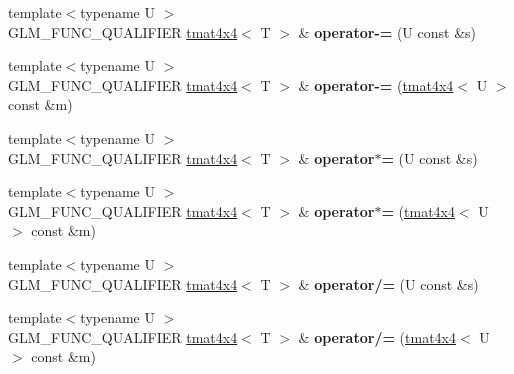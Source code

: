 \begin{DoxyCompactItemize}
\item 
\hypertarget{structglm_1_1detail_1_1tmat4x4_a4ee5d7f6aa93a3c6c816514b804e6de7}{}{\footnotesize template$<$typename U $>$ }\\G\+L\+M\+\_\+\+F\+U\+N\+C\+\_\+\+Q\+U\+A\+L\+I\+F\+I\+E\+R \hyperlink{structglm_1_1detail_1_1tmat4x4}{tmat4x4}$<$ T $>$ \& {\bfseries operator-\/=} (U const \&s)\label{structglm_1_1detail_1_1tmat4x4_a4ee5d7f6aa93a3c6c816514b804e6de7}

\item 
\hypertarget{structglm_1_1detail_1_1tmat4x4_a8f63e9aac83bd9ec75b6f3b53d02c201}{}{\footnotesize template$<$typename U $>$ }\\G\+L\+M\+\_\+\+F\+U\+N\+C\+\_\+\+Q\+U\+A\+L\+I\+F\+I\+E\+R \hyperlink{structglm_1_1detail_1_1tmat4x4}{tmat4x4}$<$ T $>$ \& {\bfseries operator-\/=} (\hyperlink{structglm_1_1detail_1_1tmat4x4}{tmat4x4}$<$ U $>$ const \&m)\label{structglm_1_1detail_1_1tmat4x4_a8f63e9aac83bd9ec75b6f3b53d02c201}

\item 
\hypertarget{structglm_1_1detail_1_1tmat4x4_a48b13d6f9fb0262bb9e1ed0429be0250}{}{\footnotesize template$<$typename U $>$ }\\G\+L\+M\+\_\+\+F\+U\+N\+C\+\_\+\+Q\+U\+A\+L\+I\+F\+I\+E\+R \hyperlink{structglm_1_1detail_1_1tmat4x4}{tmat4x4}$<$ T $>$ \& {\bfseries operator$\ast$=} (U const \&s)\label{structglm_1_1detail_1_1tmat4x4_a48b13d6f9fb0262bb9e1ed0429be0250}

\item 
\hypertarget{structglm_1_1detail_1_1tmat4x4_a322c4f8d69e070ccbd0af38d809761aa}{}{\footnotesize template$<$typename U $>$ }\\G\+L\+M\+\_\+\+F\+U\+N\+C\+\_\+\+Q\+U\+A\+L\+I\+F\+I\+E\+R \hyperlink{structglm_1_1detail_1_1tmat4x4}{tmat4x4}$<$ T $>$ \& {\bfseries operator$\ast$=} (\hyperlink{structglm_1_1detail_1_1tmat4x4}{tmat4x4}$<$ U $>$ const \&m)\label{structglm_1_1detail_1_1tmat4x4_a322c4f8d69e070ccbd0af38d809761aa}

\item 
\hypertarget{structglm_1_1detail_1_1tmat4x4_a4a5f881cf19a066120b4ae9aa2951fad}{}{\footnotesize template$<$typename U $>$ }\\G\+L\+M\+\_\+\+F\+U\+N\+C\+\_\+\+Q\+U\+A\+L\+I\+F\+I\+E\+R \hyperlink{structglm_1_1detail_1_1tmat4x4}{tmat4x4}$<$ T $>$ \& {\bfseries operator/=} (U const \&s)\label{structglm_1_1detail_1_1tmat4x4_a4a5f881cf19a066120b4ae9aa2951fad}

\item 
\hypertarget{structglm_1_1detail_1_1tmat4x4_a6f7b84c73c5682c67e6a4c1d138c022f}{}{\footnotesize template$<$typename U $>$ }\\G\+L\+M\+\_\+\+F\+U\+N\+C\+\_\+\+Q\+U\+A\+L\+I\+F\+I\+E\+R \hyperlink{structglm_1_1detail_1_1tmat4x4}{tmat4x4}$<$ T $>$ \& {\bfseries operator/=} (\hyperlink{structglm_1_1detail_1_1tmat4x4}{tmat4x4}$<$ U $>$ const \&m)\label{structglm_1_1detail_1_1tmat4x4_a6f7b84c73c5682c67e6a4c1d138c022f}

\end{DoxyCompactItemize}
